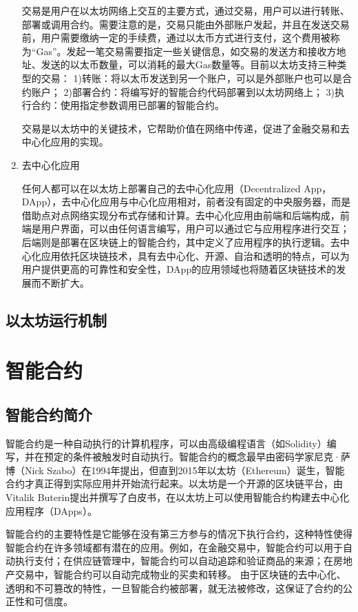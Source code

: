 \begin{enumerate}[label=\Alph*., align=left, leftmargin=*]
    交易是用户在以太坊网络上交互的主要方式，通过交易，用户可以进行转账、部署或调用合约。需要注意的是，交易只能由外部账户发起，并且在发送交易前，用户需要缴纳一定的手续费，通过以太币方式进行支付，这个费用被称为“Gas”。发起一笔交易需要指定一些关键信息，如交易的发送方和接收方地址、发送的以太币数量，可以消耗的最大Gas数量等。目前以太坊支持三种类型的交易：
    1)转账：将以太币发送到另一个账户，可以是外部账户也可以是合约账户；
    2)部署合约：将编写好的智能合约代码部署到以太坊网络上；
    3)执行合约：使用指定参数调用已部署的智能合约。

    交易是以太坊中的关键技术，它帮助价值在网络中传递，促进了金融交易和去中心化应用的实现。
    \item 去中心化应用
    
    任何人都可以在以太坊上部署自己的去中心化应用（Decentralized App，DApp），去中心化应用与中心化应用相对，前者没有固定的中央服务器，而是借助点对点网络实现分布式存储和计算。去中心化应用由前端和后端构成，前端是用户界面，可以由任何语言编写，用户可以通过它与应用程序进行交互；后端则是部署在区块链上的智能合约，其中定义了应用程序的执行逻辑。去中心化应用依托区块链技术，具有去中心化、开源、自治和透明的特点，可以为用户提供更高的可靠性和安全性，DApp的应用领域也将随着区块链技术的发展而不断扩大。
\end{enumerate}

\subsection{以太坊运行机制}
\section{智能合约}
\subsection{智能合约简介}
智能合约是一种自动执行的计算机程序，可以由高级编程语言（如Solidity）编写，并在预定的条件被触发时自动执行。智能合约的概念最早由密码学家尼克·萨博（Nick Szabo）在1994年提出，但直到2015年以太坊（Ethereum）诞生，智能合约才真正得到实际应用并开始流行起来。以太坊是一个开源的区块链平台，由Vitalik Buterin提出并撰写了白皮书，在以太坊上可以使用智能合约构建去中心化应用程序（DApps）。

智能合约的主要特性是它能够在没有第三方参与的情况下执行合约，这种特性使得智能合约在许多领域都有潜在的应用。例如，在金融交易中，智能合约可以用于自动执行支付；在供应链管理中，智能合约可以自动追踪和验证商品的来源；在房地产交易中，智能合约可以自动完成物业的买卖和转移。
由于区块链的去中心化、透明和不可篡改的特性，一旦智能合约被部署，就无法被修改，这保证了合约的公正性和可信度。

